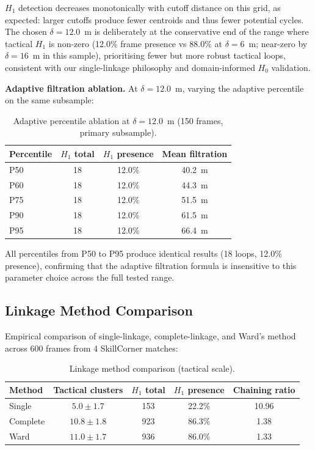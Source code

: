 \(H_1\) detection decreases monotonically with cutoff distance on this grid, as expected: larger cutoffs produce fewer centroids and thus fewer potential cycles. The chosen \(\delta=12.0\)~m is deliberately at the conservative end of the range where tactical \(H_1\) is non-zero (12.0\% frame presence vs 88.0\% at \(\delta=6\)~m; near-zero by \(\delta=16\)~m in this sample), prioritising fewer but more robust tactical loops, consistent with our single-linkage philosophy and domain-informed \(H_0\) validation.

\textbf{Adaptive filtration ablation.} At \(\delta=12.0\)~m, varying the adaptive percentile on the same subsample:

\begin{table}[H]
  \centering
  \caption{Adaptive percentile ablation at \(\delta=12.0\)~m (150 frames, primary subsample).}
  \label{tab:sensp}
  \begin{tabular}{@{}lccc@{}}
    \toprule
    Percentile & \(H_1\) total & \(H_1\) presence & Mean filtration \\
    \midrule
    P50 & 18 & 12.0\% & 40.2~m \\
    P60 & 18 & 12.0\% & 44.3~m \\
    P75 & 18 & 12.0\% & 51.5~m \\
    P90 & 18 & 12.0\% & 61.5~m \\
    P95 & 18 & 12.0\% & 66.4~m \\
    \bottomrule
  \end{tabular}
\end{table}

All percentiles from P50 to P95 produce identical results (18 loops, 12.0\% presence), confirming that the adaptive filtration formula is insensitive to this parameter choice across the full tested range.

\subsection{Linkage Method Comparison}
\label{sec:linkage}

Empirical comparison of single-linkage, complete-linkage, and Ward's method across 600 frames from 4 SkillCorner matches:

\begin{table}[H]
  \centering
  \caption{Linkage method comparison (tactical scale).}
  \label{tab:linkage}
  \begin{tabular}{@{}lcccc@{}}
    \toprule
    Method & Tactical clusters & \(H_1\) total & \(H_1\) presence & Chaining ratio \\
    \midrule
    Single   & \(5.0\pm1.7\)  & 153 & 22.2\% & 10.96 \\
    Complete & \(10.8\pm1.8\) & 923 & 86.3\% & 1.38 \\
    Ward     & \(11.0\pm1.7\) & 936 & 86.0\% & 1.33 \\
    \bottomrule
  \end{tabular}
\end{table}

